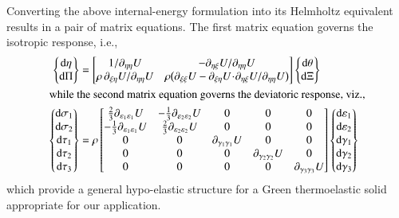 Converting the above internal-energy formulation into its Helmholtz equivalent results in a pair of matrix equations.  The first matrix equation governs the isotropic response, i.e.,
\begin{subequations}
    \label{Helmholtz3Duncoupled}
    \begin{align}
\left\{ \begin{matrix}
\mathrm{d} \eta \\ \mathrm{d} \Pi 
\end{matrix} \right\} & = \begin{bmatrix}
1 / \partial_{\eta\eta} U & -\partial_{\eta\xi} U / \partial_{\eta\eta} U \\ 
\rho \, \partial_{\xi\eta} U / \partial_{\eta\eta} U & 
\rho \bigl( \partial_{\xi\xi} U - \partial_{\xi\eta} U \!\cdot\! \partial_{\eta\xi} U / \partial_{\eta\eta} U \bigr)
\end{bmatrix}
\left\{ \begin{matrix}
\mathrm{d} \theta \\ \mathrm{d} \Xi
\end{matrix} \right\}
\label{Helmholtz3Disotropic} \\
\intertext{while the second matrix equation governs the deviatoric response, viz.,}
\left\{ \begin{matrix}
\mathrm{d} \sigma_1 \\ \mathrm{d} \sigma_2 \\ 
\mathrm{d} \tau_1 \\ \mathrm{d} \tau_2 \\ \mathrm{d} \tau_3
\end{matrix} \right\} & = \rho \begin{bmatrix}
\tfrac{2}{3} \partial_{\varepsilon_1 \varepsilon_1} U & -\tfrac{1}{3} \partial_{\varepsilon_2 \varepsilon_2} U & 0 & 0 & 0 \\
-\tfrac{1}{3} \partial_{\varepsilon_1 \varepsilon_1} U & \tfrac{2}{3} \partial_{\varepsilon_2 \varepsilon_2} U & 0 & 0 & 0 \\
0 & 0 & \partial_{\gamma_1\gamma_1} U & 0 & 0 \\
0 & 0 & 0 & \partial_{\gamma_2\gamma_2} U & 0 \\
0 & 0 & 0 & 0 & \partial_{\gamma_3\gamma_3} U
\end{bmatrix}
\left\{ \begin{matrix}
\mathrm{d} \varepsilon_1 \\ \mathrm{d} \varepsilon_2 \\
\mathrm{d} \gamma_1 \\ \mathrm{d} \gamma_2 \\ \mathrm{d} \gamma_3
\end{matrix} \right\}
\label{Helmholtz3Ddeviatoric}
\end{align}
\end{subequations}
which provide a general hypo-elastic structure for a Green thermo\-elastic solid appropriate for our application.

